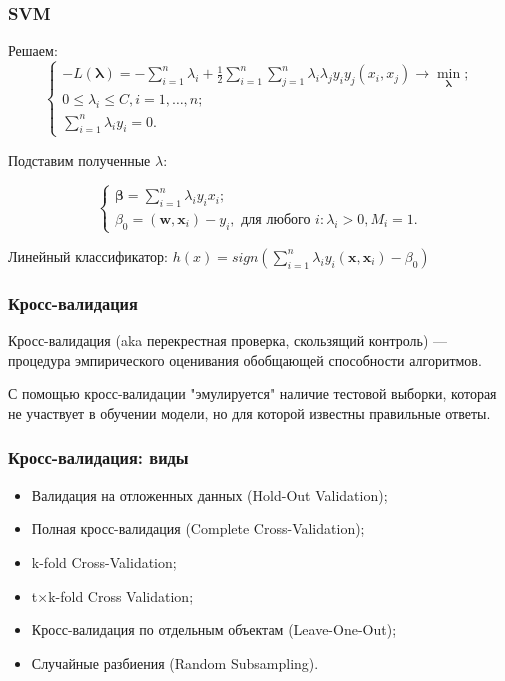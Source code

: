 \documentclass[11pt]{beamer}
\begin{document}
	\begin{frame}
	\frametitle{SVM}
	
	Решаем: 
	$$
		\begin{cases}
			-L(\bm{\lambda}) = - \sum\limits_{i=1}^n \lambda_i + \frac{1}{2} \sum\limits_{i=1}^{n}\sum\limits_{j=1}^{n} \lambda_i \lambda_j y_i y_j (x_i, x_j) \rightarrow \min\limits_{\bm{\lambda}}; \\
			0 \leqslant \lambda_i \leqslant C, i = 1, \dotsc, n; \\
			\sum\limits_{i=1}^{n} \lambda_i y_i = 0.
		\end{cases}
	$$
	
	Подставим полученные $\lambda$:
	
	$$
	\begin{cases}
		\bm{\beta} = \sum\limits_{i=1}^n \lambda_i y_i x_i;\\
		\beta_0 = (\bm{w}, \bm{x}_i) - y_i, \text{ для любого } i: \lambda_i > 0, M_i = 1.
	\end{cases}
	$$
	
	Линейный классификатор: $ h(x) = sign ( \sum\limits_{i=1}^{n} \lambda_i y_i (\bm{x}, \bm{x}_i) - \beta_0) $
	\end{frame}	
	
	

	\begin{frame}
		\frametitle{Кросс-валидация}
		Кросс-валидация (aka перекрестная проверка, скользящий контроль) --- процедура эмпирического оценивания обобщающей способности алгоритмов. 
		
		С помощью кросс-валидации "эмулируется" наличие тестовой выборки, которая не участвует в обучении модели, но для которой известны правильные ответы.
		
	\end{frame}
	\begin{frame}
		\frametitle{Кросс-валидация: виды}
		\begin{itemize}
			\item Валидация на отложенных данных (Hold-Out Validation);
			\item Полная кросс-валидация (Complete Cross-Validation);
			\item k-fold Cross-Validation;
			\item t$\times$k-fold Cross Validation;
			\item Кросс-валидация по отдельным объектам (Leave-One-Out);
			\item Случайные разбиения (Random Subsampling).
		\end{itemize}
		
	\end{frame}
\end{document}
